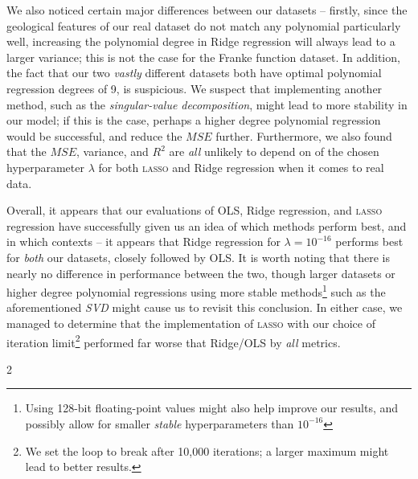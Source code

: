 \documentclass[a4paper,10pt,english]{article}
\begin{document}
\begin{multicols*}{2}
We also noticed certain major differences between our datasets – firstly, since the geological features of our real dataset do not match any polynomial particularly well, increasing the polynomial degree in Ridge regression will always lead to a larger variance; this is not the case for the Franke function dataset.  In addition, the fact that our two \textit{vastly} different datasets both have optimal polynomial regression degrees of 9, is suspicious.  We suspect that implementing another method, such as the \textit{singular-value decomposition}, might lead to more stability in our model; if this is the case, perhaps a higher degree polynomial regression would be successful, and reduce the $MSE$ further.  Furthermore, we also found that the $MSE$, variance, and $R^2$ are \textit{all} unlikely to depend on of the chosen hyperparameter $\lambda$ for both \textsc{lasso} and Ridge regression when it comes to real data.

Overall, it appears that our evaluations of OLS, Ridge regression, and \textsc{lasso} regression have successfully given us an idea of which methods perform best, and in which contexts – it appears that Ridge regression for $\lambda = 10^{-16}$ performs best for \textit{both} our datasets, closely followed by OLS.  It is worth noting that there is nearly no difference in performance between the two, though larger datasets or higher degree polynomial regressions using more stable methods\footnote{Using 128-bit floating-point values might also help improve our results, and possibly allow for smaller \textit{stable} hyperparameters than $10^{-16}$} such as the aforementioned \textit{SVD} might cause us to revisit this conclusion.  In either case, we managed to determine that the implementation of \textsc{lasso} with our choice of iteration limit\footnote{We set the loop to break after 10,000 iterations; a larger maximum might lead to better results.} performed far worse that Ridge/OLS by \textit{all} metrics.

\end{multicols*}{2}
{}

\end{document}

